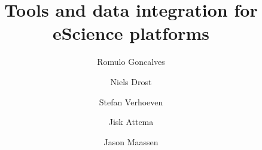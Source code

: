 \documentclass[conference]{IEEEtran}
\begin{document}

\title{\textbf{Tools and data integration for eScience platforms}}
\author[1]{Romulo Goncalves}
\author[1]{Niels Drost}
\author[1]{Stefan Verhoeven}
\author[1]{Jisk Attema}
\author[1]{Jason Maassen}



\date{} %
\maketitle\thispagestyle{empty} %

\begin{abstract}
\end{abstract}






%
%
\end{document}
